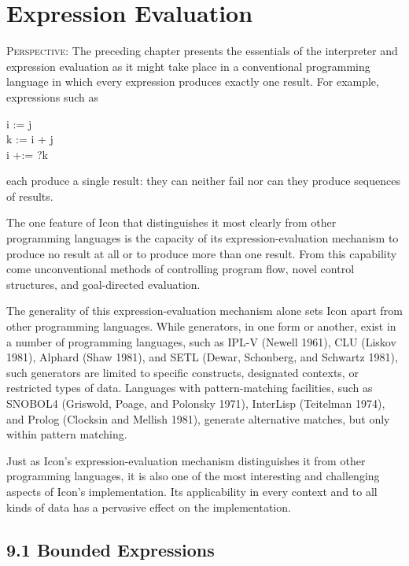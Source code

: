 \chapter{Expression Evaluation}

\textsc{Perspective}: The preceding chapter presents the essentials of
the interpreter and expression evaluation as it might take place in a
conventional programming language in which every expression produces
exactly one result. For example, expressions such as

\begin{iconcode}
\>i := j \\
\>k := i + j\\
\>i +:= ?k
\end{iconcode}

\noindent each produce a single result: they can neither fail nor can
they produce sequences of results.

The one feature of Icon that distinguishes it most clearly from other
programming languages is the capacity of its expression-evaluation
mechanism to produce no result at all or to produce more than one
result. From this capability come unconventional methods of
controlling program flow, novel control structures, and goal-directed
evaluation.

The generality of this expression-evaluation mechanism alone sets Icon
apart from other programming languages. While generators, in one form
or another, exist in a number of programming languages, such as IPL-V
(Newell 1961), CLU (Liskov 1981), Alphard (Shaw 1981), and SETL
(Dewar, Schonberg, and Schwartz 1981), such generators are limited to
specific constructs, designated contexts, or restricted types of
data. Languages with pattern-matching facilities, such as SNOBOL4
(Griswold, Poage, and Polonsky 1971), InterLisp (Teitelman 1974), and
Prolog (Clocksin and Mellish 1981), generate alternative matches, but
only within pattern matching.

Just as Icon's expression-evaluation mechanism distinguishes it from
other programming languages, it is also one of the most interesting
and challenging aspects of Icon's implementation. Its applicability in
every context and to all kinds of data has a pervasive effect on the
implementation.


\section[9.1 Bounded Expressions]{9.1 Bounded Expressions}

